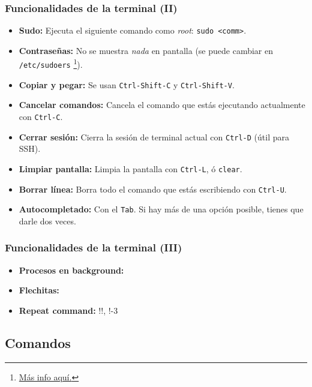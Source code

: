 \documentclass[aspectratio=43]{beamer}
\begin{document}
\begin{frame}
    \frametitle{Funcionalidades de la terminal (II)}

    \begin{itemize}
        \item \textbf{Sudo:} Ejecuta el siguiente comando como \textit{root}: \texttt{sudo <comm>}.
        \item \textbf{Contraseñas:} No se muestra \textit{nada} en pantalla (se puede cambiar en \texttt{/etc/sudoers} \footnote{\href{https://www.howtogeek.com/194010/how-to-make-password-asterisks-visible-in-the-terminal-window-in-linux/}{Más info aquí.}}). 
        \item \textbf{Copiar y pegar:} Se usan \texttt{Ctrl-Shift-C} y \texttt{Ctrl-Shift-V}.
        \item \textbf{Cancelar comandos:} Cancela el comando que estás ejecutando actualmente con \texttt{Ctrl-C}.
        \item \textbf{Cerrar sesión:} Cierra la sesión de terminal actual con \texttt{Ctrl-D} (útil para SSH).
        \item \textbf{Limpiar pantalla:} Limpia la pantalla con \texttt{Ctrl-L}, ó \texttt{clear}.
        \item \textbf{Borrar línea:} Borra todo el comando que estás escribiendo con \texttt{Ctrl-U}.
        \item \textbf{Autocompletado:} Con el \texttt{Tab}. Si hay más de una opción posible, tienes que darle dos veces.
    \end{itemize}

\end{frame}

\begin{frame}
    \frametitle{Funcionalidades de la terminal (III)}
    
    \begin{itemize}
        \item \textbf{Procesos en background:} 
        \item \textbf{Flechitas:} 
        \item \textbf{Repeat command:} !!, !-3
    \end{itemize}

\end{frame}


\subsection{Comandos}
\end{document}
